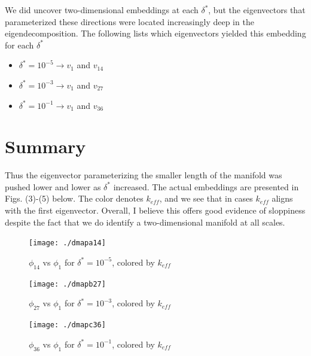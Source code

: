 \documentclass[11pt]{article}
\begin{document}
We did uncover two-dimensional embeddings at each $\delta^*$, but the
eigenvectors that parameterized these directions were located
increasingly deep in the eigendecomposition. The following lists which
eigenvectors yielded this embedding for each $\delta^*$

\begin{itemize}
  \item $\delta^* = 10^{-5} \rightarrow v_1$ and $v_{14}$
  \item $\delta^* = 10^{-3} \rightarrow v_1$ and $v_{27}$
  \item $\delta^* = 10^{-1} \rightarrow v_1$ and $v_{36}$
\end{itemize}

\section{Summary}
Thus the eigenvector parameterizing the smaller length of the manifold
was pushed lower and lower as $\delta^*$ increased. The actual
embeddings are presented in Figs. (3)-(5) below. The color denotes
$k_{eff}$, and we see that in cases $k_{eff}$ aligns with the first eigenvector. Overall, I believe
this offers good evidence of sloppiness despite the fact that we do
identify a two-dimensional manifold at all scales.

\begin{figure}[htbp]
  \centering
  \texttt{[image: ./dmapa14]}
  \caption{$\phi_{14}$ vs $\phi_{1}$ for $\delta^* = 10^{-5}$, colored
  by $k_{eff}$}
\end{figure}

\begin{figure}[htbp]
  \centering
  \texttt{[image: ./dmapb27]}
  \caption{$\phi_{27}$ vs $\phi_{1}$ for $\delta^* = 10^{-3}$, colored
  by $k_{eff}$}
\end{figure}

\begin{figure}[htbp]
  \centering
  \texttt{[image: ./dmapc36]}
  \caption{$\phi_{36}$ vs $\phi_{1}$ for $\delta^* = 10^{-1}$, colored
  by $k_{eff}$}
\end{figure}

% 
% 
\end{document}
